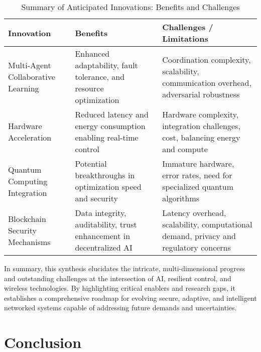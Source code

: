 \documentclass[sigconf]{acmart}
\begin{document}
\begin{table*}[htbp]
\centering
\caption{Summary of Anticipated Innovations: Benefits and Challenges}
\label{tab:anticipated_innovations}
\begin{adjustbox}{max width=\textwidth}
\begin{tabular}{@{}lll@{}}
\toprule
\textbf{Innovation} &
  \textbf{Benefits} &
  \textbf{Challenges / Limitations} \\ \midrule
Multi-Agent Collaborative Learning &
  Enhanced adaptability, fault tolerance, and resource optimization~\cite{ref49} &
  Coordination complexity, scalability, communication overhead, adversarial robustness \\
Hardware Acceleration &
  Reduced latency and energy consumption enabling real-time control~\cite{ref50} &
  Hardware complexity, integration challenges, cost, balancing energy and compute \\
Quantum Computing Integration &
  Potential breakthroughs in optimization speed and security &
  Immature hardware, error rates, need for specialized quantum algorithms \\
Blockchain Security Mechanisms &
  Data integrity, auditability, trust enhancement in decentralized AI~\cite{ref54} &
  Latency overhead, scalability, computational demand, privacy and regulatory concerns \\
\bottomrule
\end{tabular}
\end{adjustbox}
\end{table*}

In summary, this synthesis elucidates the intricate, multi-dimensional progress and outstanding challenges at the intersection of AI, resilient control, and wireless technologies. By highlighting critical enablers and research gaps, it establishes a comprehensive roadmap for evolving secure, adaptive, and intelligent networked systems capable of addressing future demands and uncertainties.

\section{Conclusion}
\end{document}
